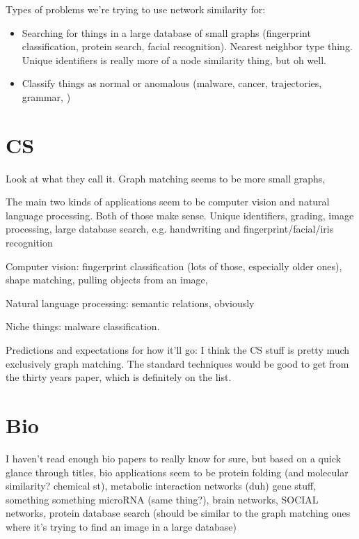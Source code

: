 \documentclass[12pt]{thesis}
\theoremstyle{plain}
\theoremstyle{definition}
\theoremstyle{remark}
\begin{document}
Types of problems we're trying to use network similarity for:

\begin{itemize}
\item Searching for things in a large database of small graphs (fingerprint classification, protein search, facial recognition). Nearest neighbor type thing. Unique identifiers is really more of a node similarity thing, but oh well.
\item Classify things as normal or anomalous (malware, cancer, trajectories, grammar, )
\end{itemize}



\chapter{CS}

Look at what they call it. Graph matching seems to be more small graphs, 

The main two kinds of applications seem to be computer vision and natural language processing. Both of those make sense. Unique identifiers, grading, image processing, large database search, e.g. handwriting and fingerprint/facial/iris recognition

Computer vision: fingerprint classification (lots of those, especially older ones), shape matching, pulling objects from an image, 

Natural language processing: semantic relations, obviously

Niche things: malware classification. 

Predictions and expectations for how it'll go: I think the CS stuff is pretty much exclusively graph matching. The standard techniques would be good to get from the thirty years paper, which is definitely on the list. 


\chapter{Bio}

I haven't read enough bio papers to really know for sure, but based on a quick glance through titles, bio applications seem to be protein folding (and molecular similarity? chemical st), metabolic interaction networks (duh) gene stuff, something something microRNA (same thing?), brain networks, SOCIAL networks, protein database search (should be similar to the graph matching ones where it's trying to find an image in a large database)
\end{document}
